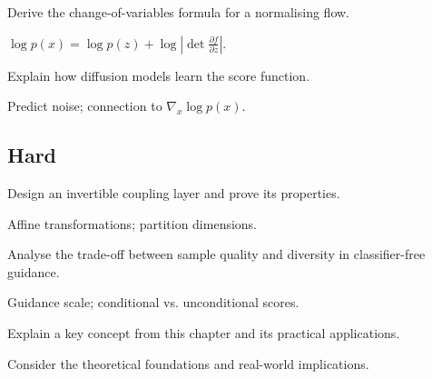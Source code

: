 \begin{exercisebox}[medium]
\begin{problem}
Derive the change-of-variables formula for a normalising flow.
\end{problem}
\begin{hintbox}
$\log p(x) = \log p(z) + \log|\det \frac{\partial f}{\partial z}|$.
\end{hintbox}
\end{exercisebox}


\begin{exercisebox}[medium]
\begin{problem}
Explain how diffusion models learn the score function.
\end{problem}
\begin{hintbox}
Predict noise; connection to $\nabla_x \log p(x)$.
\end{hintbox}
\end{exercisebox}


\subsection*{Hard}

\begin{exercisebox}[hard]
\begin{problem}
Design an invertible coupling layer and prove its properties.
\end{problem}
\begin{hintbox}
Affine transformations; partition dimensions.
\end{hintbox}
\end{exercisebox}


\begin{exercisebox}[hard]
\begin{problem}
Analyse the trade-off between sample quality and diversity in classifier-free guidance.
\end{problem}
\begin{hintbox}
Guidance scale; conditional vs. unconditional scores.
\end{hintbox}
\end{exercisebox}



\begin{exercisebox}[hard]
\begin{problem}
Explain a key concept from this chapter and its practical applications.
\end{problem}
\begin{hintbox}
Consider the theoretical foundations and real-world implications.
\end{hintbox}
\end{exercisebox}


